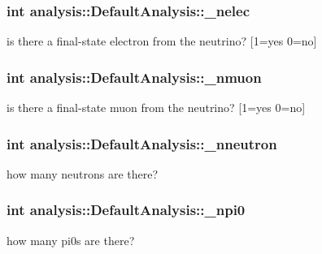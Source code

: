 \subsubsection[{\texorpdfstring{\+\_\+nelec}{_nelec}}]{\setlength{\rightskip}{0pt plus 5cm}int analysis\+::\+Default\+Analysis\+::\+\_\+nelec\hspace{0.3cm}{\ttfamily [private]}}\hypertarget{classanalysis_1_1DefaultAnalysis_a6aa372d8781339f60a044c92d974ae53}{}\label{classanalysis_1_1DefaultAnalysis_a6aa372d8781339f60a044c92d974ae53}
is there a final-\/state electron from the neutrino? \mbox{[}1=yes 0=no\mbox{]} 
\subsubsection[{\texorpdfstring{\+\_\+nmuon}{_nmuon}}]{\setlength{\rightskip}{0pt plus 5cm}int analysis\+::\+Default\+Analysis\+::\+\_\+nmuon\hspace{0.3cm}{\ttfamily [private]}}\hypertarget{classanalysis_1_1DefaultAnalysis_a6adae9dc9394640a78756a1da65b2162}{}\label{classanalysis_1_1DefaultAnalysis_a6adae9dc9394640a78756a1da65b2162}
is there a final-\/state muon from the neutrino? \mbox{[}1=yes 0=no\mbox{]} 
\subsubsection[{\texorpdfstring{\+\_\+nneutron}{_nneutron}}]{\setlength{\rightskip}{0pt plus 5cm}int analysis\+::\+Default\+Analysis\+::\+\_\+nneutron\hspace{0.3cm}{\ttfamily [private]}}\hypertarget{classanalysis_1_1DefaultAnalysis_afb7f9e564492c71227112ce13f52ce9c}{}\label{classanalysis_1_1DefaultAnalysis_afb7f9e564492c71227112ce13f52ce9c}
how many neutrons are there? 
\subsubsection[{\texorpdfstring{\+\_\+npi0}{_npi0}}]{\setlength{\rightskip}{0pt plus 5cm}int analysis\+::\+Default\+Analysis\+::\+\_\+npi0\hspace{0.3cm}{\ttfamily [private]}}\hypertarget{classanalysis_1_1DefaultAnalysis_ab6eca9a94c20a6fb7e127043f165ff9b}{}\label{classanalysis_1_1DefaultAnalysis_ab6eca9a94c20a6fb7e127043f165ff9b}
how many pi0s are there? 
